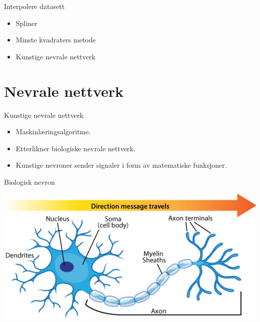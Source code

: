 \documentclass{beamer}
\begin{document}
\begin{frame}
 
\begin{block}{Interpolere datasett}
 \begin{itemize}
  \item Spliner
  \item Minste kvadraters metode
  \item Kunstige nevrale nettverk
 \end{itemize}
\end{block}
 
\end{frame}


\section{Nevrale nettverk}


\begin{frame}

\begin{block}{Kunstige nevrale nettverk}
 \begin{itemize}
  \item Maskinlæringsalgoritme.  
  \item Etterlikner biologiske nevrale nettverk.
  \item Kunstige nevroner sender signaler i form av matematiske funksjoner. 
 \end{itemize}
\end{block}

\end{frame}


\begin{frame}{Biologisk nevron}
 
\centering
\includegraphics[width=0.8\linewidth]{../Figures/Theory/neuron_anatomy.jpg} 

\end{frame}
\end{document}
